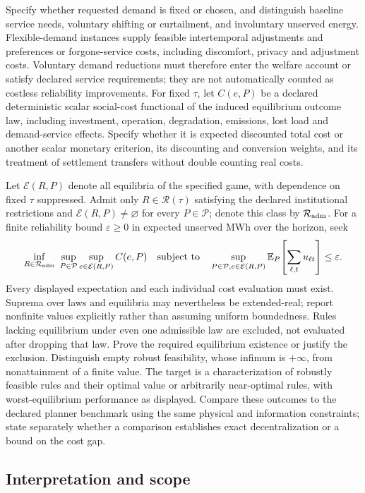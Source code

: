 \documentclass[11pt,a4paper]{article}
\begin{document}
Specify whether requested demand is fixed or chosen, and distinguish baseline service needs, voluntary shifting or curtailment, and involuntary unserved energy. Flexible-demand instances supply feasible intertemporal adjustments and preferences or forgone-service costs, including discomfort, privacy and adjustment costs. Voluntary demand reductions must therefore enter the welfare account or satisfy declared service requirements; they are not automatically counted as costless reliability improvements. For fixed $\tau$, let $C(e,P)$ be a declared deterministic scalar social-cost functional of the induced equilibrium outcome law, including investment, operation, degradation, emissions, lost load and demand-service effects. Specify whether it is expected discounted total cost or another scalar monetary criterion, its discounting and conversion weights, and its treatment of settlement transfers without double counting real costs.

Let $\mathcal E(R,P)$ denote all equilibria of the specified game, with dependence on fixed $\tau$ suppressed. Admit only $R\in\mathcal R(\tau)$ satisfying the declared institutional restrictions and $\mathcal E(R,P)\ne\varnothing$ for every $P\in\mathcal P$; denote this class by $\mathcal R_{\rm adm}$. For a finite reliability bound $\varepsilon\geq0$ in expected unserved MWh over the horizon, seek
\[
\inf_{R\in\mathcal R_{\rm adm}}\ \sup_{P\in\mathcal P}\sup_{e\in\mathcal E(R,P)} C(e,P)
\quad\text{subject to}\quad
\sup_{P\in\mathcal P,e\in\mathcal E(R,P)}
\mathbb E_P\!\left[\sum_{\ell,t}u_{\ell t}\right]\le\varepsilon .
\]
Every displayed expectation and each individual cost evaluation must exist. Suprema over laws and equilibria may nevertheless be extended-real; report nonfinite values explicitly rather than assuming uniform boundedness. Rules lacking equilibrium under even one admissible law are excluded, not evaluated after dropping that law. Prove the required equilibrium existence or justify the exclusion. Distinguish empty robust feasibility, whose infimum is $+\infty$, from nonattainment of a finite value. The target is a characterization of robustly feasible rules and their optimal value or arbitrarily near-optimal rules, with worst-equilibrium performance as displayed. Compare these outcomes to the declared planner benchmark using the same physical and information constraints; state separately whether a comparison establishes exact decentralization or a bound on the cost gap.

\subsection*{Interpretation and scope}
\end{document}

